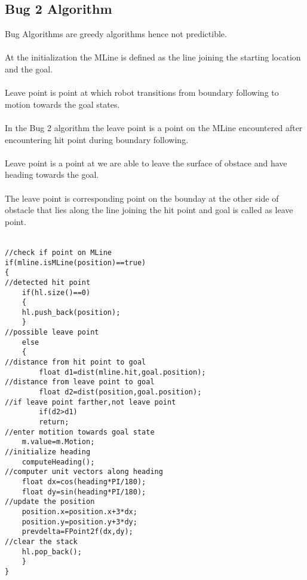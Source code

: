 \documentclass[fontsize=12pt, %
                             paper=a4, %
                             oneside, %
                             captions=tableheading,
                             index=totoc,
                             hyperref]{labbook}
\begin{document}
\subsection{Bug 2 Algorithm}
Bug Algorithms are greedy algorithms hence not predictible.
\\\\
At the initialization the MLine is defined as the line joining the starting
location and the goal.
\\\\
Leave point is point at which robot transitions from boundary following
to motion towards the goal states.
\\\\
In the Bug 2 algorithm the leave point is a point on the MLine encountered
after encountering hit point during boundary following.
\\\\
Leave point is a point at we are able to leave the surface of obstace and have
heading towards the goal.
\\\\
The leave point is corresponding point on the bounday at the other side of obstacle that lies 
along the line joining the hit point and goal is called as leave point.
\\\\
\begin{verbatim}
//check if point on MLine
if(mline.isMLine(position)==true)
{
//detected hit point
	if(hl.size()==0)
	{
	hl.push_back(position);
	}
//possible leave point	
	else
	{
//distance from hit point to goal	
	    float d1=dist(mline.hit,goal.position);
//distance from leave point to goal	    
	    float d2=dist(position,goal.position);
//if leave point farther,not leave point	    
	    if(d2>d1)
		return;
//enter motition towards goal state		
	m.value=m.Motion;
//initialize heading	
	computeHeading();
//computer unit vectors along heading	
	float dx=cos(heading*PI/180);
	float dy=sin(heading*PI/180);
//update the position	
	position.x=position.x+3*dx;
	position.y=position.y+3*dy;
	prevdelta=FPoint2f(dx,dy);
//clear the stack	
	hl.pop_back();
	}
}

\end{verbatim}
\end{document}
